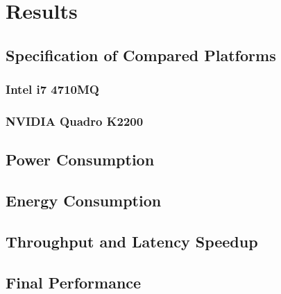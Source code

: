 \chapter{Results}

\label{Chapter-Results}

\section{Specification of Compared Platforms}
\subsection{Intel i7 4710MQ}
\subsection{NVIDIA Quadro K2200}

\section{Power Consumption}

\section{Energy Consumption}

\section{Throughput and Latency Speedup}

\section{Final Performance}
